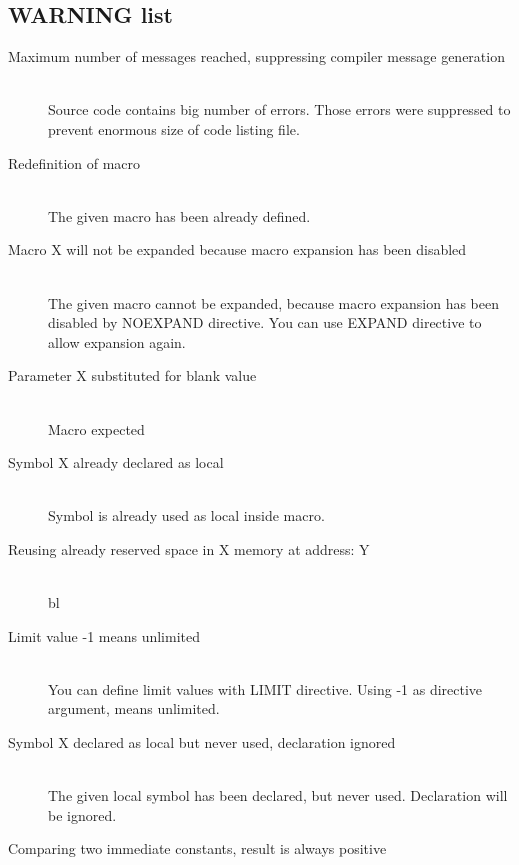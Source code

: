 {                 \subsection{WARNING list}
                    \begin{description}
                    \item[Maximum number of messages reached, suppressing compiler message generation] \hfill \\
                    Source code contains big number of errors. Those errors were suppressed to prevent enormous size of code listing file.
                    \item[Redefinition of macro ] \hfill \\
                    The given macro has been already defined.
                    \item[Macro X will not be expanded because macro expansion has been disabled] \hfill \\
                    The given macro cannot be expanded, because macro expansion has been disabled by NOEXPAND directive.
                    You can use EXPAND directive to allow expansion again.
                    \item[Parameter X substituted for blank value ] \hfill \\     %
                    Macro expected
                    \item[Symbol X already declared as local ] \hfill \\
                    Symbol is already used as local inside macro.   %
                    \item[Reusing already reserved space in X memory at address: Y] \hfill \\  %
                    bl
                    \item[Limit value -1 means unlimited] \hfill \\
                    You can define limit values with LIMIT directive. Using -1 as directive argument, means unlimited.
                    \item[Symbol X declared as local but never used, declaration ignored] \hfill \\
                    The given local symbol has been declared, but never used. Declaration will be ignored.
                    \item[Comparing two immediate constants, result is always positive] \hfill \\


\end{description}}
